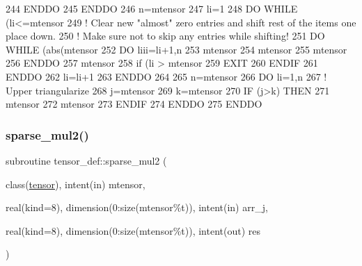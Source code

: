 \begin{DoxyCode}
244 \textcolor{keywordflow}{        ENDDO}
245 \textcolor{keywordflow}{      ENDDO}
246       n=mtensor%
247       li=1
248       \textcolor{keywordflow}{DO} \textcolor{keywordflow}{WHILE} (li<=mtensor%
249         \textcolor{comment}{! Clear new "almost" zero entries and shift rest of the items one place down.}
250         \textcolor{comment}{! Make sure not to skip any entries while shifting!}
251         \textcolor{keywordflow}{DO} \textcolor{keywordflow}{WHILE} (abs(mtensor%
252           \textcolor{keywordflow}{DO} liii=li+1,n
253             mtensor%
254             mtensor%
255             mtensor%
256 \textcolor{keywordflow}{          ENDDO}
257           mtensor%
258           \textcolor{keywordflow}{if} (li > mtensor%
259             \textcolor{keywordflow}{EXIT}
260 \textcolor{keywordflow}{          ENDIF}
261 \textcolor{keywordflow}{        ENDDO}
262         li=li+1
263 \textcolor{keywordflow}{      ENDDO}
264 
265       n=mtensor%
266       \textcolor{keywordflow}{DO} li=1,n
267         \textcolor{comment}{! Upper triangularize}
268         j=mtensor%
269         k=mtensor%
270         \textcolor{keywordflow}{IF} (j>k) \textcolor{keywordflow}{THEN}
271           mtensor%
272           mtensor%
273 \textcolor{keywordflow}{        ENDIF}
274 \textcolor{keywordflow}{      ENDDO}
275 \textcolor{keywordflow}{    ENDDO}
\end{DoxyCode}
\mbox{\label{namespacetensor__def_a71cbdf082bb9e4661e5568b4bf7606ff}} 
\subsubsection{\texorpdfstring{sparse\+\_\+mul2()}{sparse\_mul2()}}
{\footnotesize\ttfamily subroutine tensor\+\_\+def\+::sparse\+\_\+mul2 (\begin{DoxyParamCaption}\item[{class(\hyperlink{structtensor__def_1_1tensor}{tensor}), intent(in)}]{mtensor,  }\item[{real(kind=8), dimension(0\+:size(mtensor\%t)), intent(in)}]{arr\+\_\+j,  }\item[{real(kind=8), dimension(0\+:size(mtensor\%t)), intent(out)}]{res }\end{DoxyParamCaption})\hspace{0.3cm}{\ttfamily [private]}}



